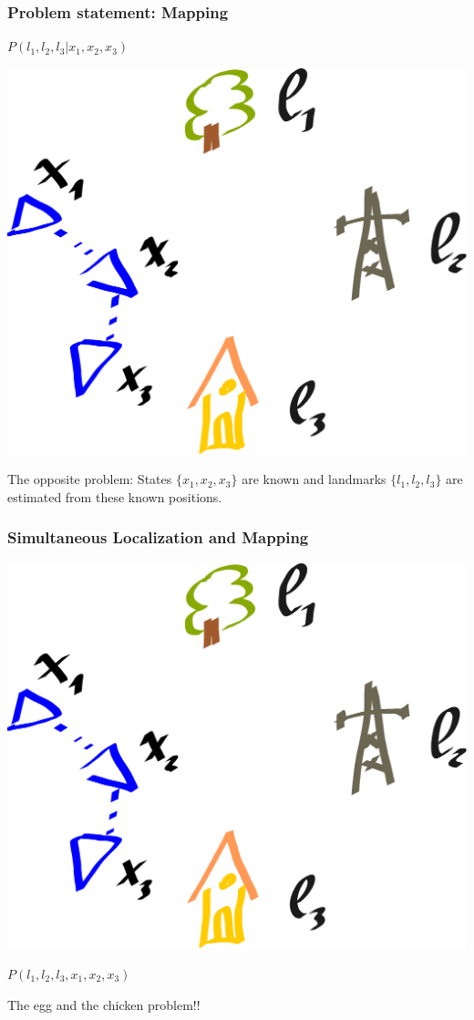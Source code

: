\documentclass[xetex,mathserif,serif]{beamer} %
\begin{document}
\begin{frame}
\frametitle{Problem statement: Mapping}



$P(l_1,l_2,l_3 | x_1, x_2, x_3)$

\begin{center}
\includegraphics[width=.5\textwidth]{localization}
\end{center}

The opposite problem: States $\{x_1,x_2,x_3\}$ are known and landmarks $\{l_1,l_2,l_3\}$ are estimated from these known positions. 

\end{frame}

\begin{frame}
\frametitle{Simultaneous Localization and Mapping}

\begin{center}
\includegraphics[width=.5\textwidth]{localization}
\end{center}


$P(l_1,l_2,l_3, x_1, x_2, x_3)$

\pause
The egg and the chicken problem!!

\end{frame}
\end{document}
